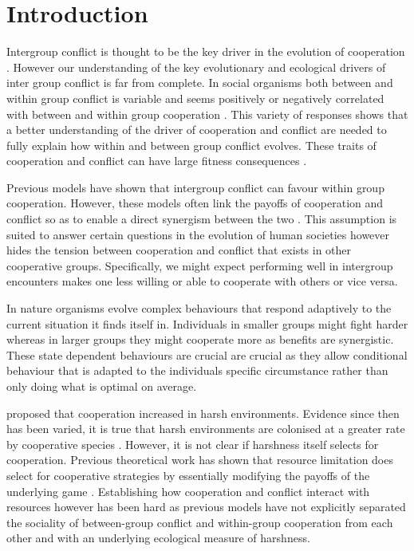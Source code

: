 \section{Introduction}

Intergroup conflict is thought to be the key driver in the evolution of cooperation \citep{radfordWithingroupBehavioural2016,kappelerMindGap2010,barkerWithingroupCompetition2012}. 
However our understanding of the key evolutionary and ecological drivers of inter group conflict is far from complete. 
In social organisms both between and within group conflict is variable and seems positively or negatively correlated with between and within group cooperation \citep{radfordWithingroupBehavioural2016}. 
This variety of responses shows that a better understanding of the driver of cooperation and conflict are needed to fully explain how within and between group conflict evolves. 
These traits of cooperation and conflict can have large fitness consequences \citep{thompsonCausesConsequences2017,vitikainenLiveLong2019}.

Previous models have shown that intergroup conflict can favour within group cooperation. 
However, these models often link the payoffs of cooperation and conflict so as to enable a direct synergism between the two \citep{choiCoevolutionParochial2007,lehmannWarEvolution2008a}. 
This assumption is suited to answer certain questions in the evolution of human societies however hides the tension between cooperation and conflict that exists in other cooperative groups. 
Specifically, we might expect performing well in intergroup encounters makes one less willing or able to cooperate with others or vice versa.  

In nature organisms evolve complex behaviours that respond adaptively to the current situation it finds itself in. Individuals in smaller groups might fight harder whereas in larger groups they might cooperate more as benefits are synergistic. These state dependent behaviours are crucial are crucial as they allow conditional behaviour that is adapted to the individuals specific circumstance rather than only doing what is optimal on average. 

 proposed that cooperation increased in harsh environments. Evidence since then has been varied, it is true that harsh environments are colonised at a greater rate by cooperative species \citep{cornwallisCooperationFacilitates2017}. However, it is not clear if harshness itself selects for cooperation. Previous theoretical work has shown that resource limitation does select for cooperative strategies by essentially modifying the payoffs of the underlying game \citep{requejoEvolutionCooperation2011,smaldinoIncreasedCosts2013}. Establishing how cooperation and conflict interact with resources however has been hard as previous models have not explicitly separated the sociality of between-group conflict and within-group cooperation from each other and with an underlying ecological measure of harshness. 

